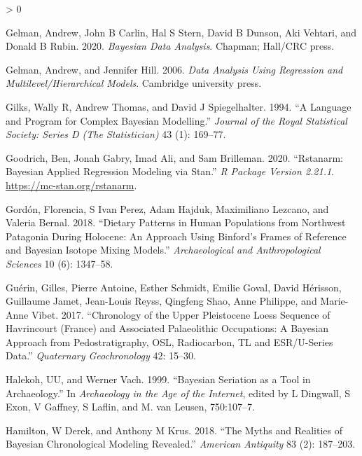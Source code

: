 \documentclass[
]{article}
\newlength{\cslhangindent}
\newenvironment{CSLReferences}[2] %
 {%
  \setlength{\parindent}{0pt}
  \ifodd #1 \everypar{\setlength{\hangindent}{\cslhangindent}}\ignorespaces\fi
  \ifnum #2 > 0
  \setlength{\parskip}{#2\baselineskip}
  \fi
 }%
 {}
\begin{document}
\begin{CSLReferences}{1}{0}
\leavevmode\hypertarget{ref-gelman_bayesian_2020}{}%
Gelman, Andrew, John B Carlin, Hal S Stern, David B Dunson, Aki Vehtari,
and Donald B Rubin. 2020. \emph{Bayesian Data Analysis}. Chapman;
Hall/CRC press.

\leavevmode\hypertarget{ref-gelman_data_2006}{}%
Gelman, Andrew, and Jennifer Hill. 2006. \emph{Data Analysis Using
Regression and Multilevel/Hierarchical Models}. Cambridge university
press.

\leavevmode\hypertarget{ref-gilks_language_1994}{}%
Gilks, Wally R, Andrew Thomas, and David J Spiegelhalter. 1994. {``A
Language and Program for Complex {Bayesian} Modelling.''} \emph{Journal
of the Royal Statistical Society: Series D (The Statistician)} 43 (1):
169--77.

\leavevmode\hypertarget{ref-goodrich_rstanarm_2020}{}%
Goodrich, Ben, Jonah Gabry, Imad Ali, and Sam Brilleman. 2020.
{``Rstanarm: {Bayesian} Applied Regression Modeling via {Stan}.''}
\emph{R Package Version 2.21.1}. \url{https://mc-stan.org/rstanarm}.

\leavevmode\hypertarget{ref-gordon_dietary_2018}{}%
Gordón, Florencia, S Ivan Perez, Adam Hajduk, Maximiliano Lezcano, and
Valeria Bernal. 2018. {``Dietary Patterns in Human Populations from
Northwest {Patagonia} During {Holocene}: An Approach Using {Binford}'s
Frames of Reference and {Bayesian} Isotope Mixing Models.''}
\emph{Archaeological and Anthropological Sciences} 10 (6): 1347--58.

\leavevmode\hypertarget{ref-guerin_chronology_2017}{}%
Guérin, Gilles, Pierre Antoine, Esther Schmidt, Emilie Goval, David
Hérisson, Guillaume Jamet, Jean-Louis Reyss, Qingfeng Shao, Anne
Philippe, and Marie-Anne Vibet. 2017. {``Chronology of the {Upper}
{Pleistocene} Loess Sequence of {Havrincourt} ({France}) and Associated
{Palaeolithic} Occupations: {A} {Bayesian} Approach from
Pedostratigraphy, {OSL}, Radiocarbon, {TL} and {ESR}/{U}-Series Data.''}
\emph{Quaternary Geochronology} 42: 15--30.

\leavevmode\hypertarget{ref-halekoh_bayesian_1999}{}%
Halekoh, UU, and Werner Vach. 1999. {``Bayesian Seriation as a Tool in
Archaeology.''} In \emph{Archaeology in the {Age} of the {Internet}},
edited by L Dingwall, S Exon, V Gaffney, S Laflin, and M. van Leusen,
750:107--7.

\leavevmode\hypertarget{ref-hamilton_myths_2018}{}%
Hamilton, W Derek, and Anthony M Krus. 2018. {``The Myths and Realities
of {Bayesian} Chronological Modeling Revealed.''} \emph{American
Antiquity} 83 (2): 187--203.


\end{CSLReferences}
\end{document}
